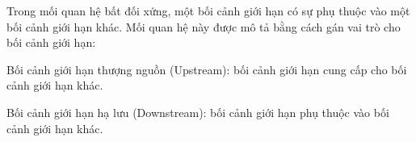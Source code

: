 
Trong mối quan hệ bất đối xứng, một bối cảnh giới hạn có sự phụ thuộc vào một bối cảnh giới hạn khác. Mối quan hệ này được mô tả bằng cách gán vai trò cho bối cảnh giới hạn:

Bối cảnh giới hạn thượng nguồn (Upstream): bối cảnh giới hạn cung cấp cho bối cảnh giới hạn khác.

Bối cảnh giới hạn hạ lưu (Downstream): bối cảnh giới hạn phụ thuộc vào bối cảnh giới hạn khác.









